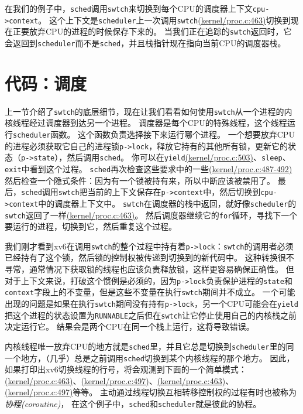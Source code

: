 在我们的例子中，\texttt{sched}调用\texttt{swtch}来切换到每个CPU的调度器上下文\texttt{cpu->context}。
这个上下文是\texttt{scheduler}上一次调用\texttt{swtch}\href{https://github.com/mit-pdos/xv6-riscv/blob/risc/kernel/proc.c#L463}{(kernel/proc.c:463)}切换到现在正要放弃CPU的进程的时候保存下来的。
当我们正在追踪的\texttt{swtch}返回时，它会返回到\texttt{scheduler}而不是\texttt{sched}，并且栈指针现在指向当前CPU的调度器栈。

\section{代码：调度}
上一节介绍了\texttt{swtch}的底层细节，现在让我们看看如何使用\texttt{swtch}从一个进程的内核线程经过调度器到达另一个进程。
调度器是每个CPU的特殊线程，这个线程运行\texttt{scheduler}函数。
这个函数负责选择接下来运行哪个进程。
一个想要放弃CPU的进程必须获取它自己的进程锁\texttt{p->lock}，释放它持有的其他所有锁，更新它的状态（\texttt{p->state}），然后调用\texttt{sched}。
你可以在\texttt{yield}\href{https://github.com/mit-pdos/xv6-riscv/blob/risc/kernel/proc.c#L503}{(kernel/proc.c:503)}、\texttt{sleep}、\texttt{exit}中看到这个过程。
\texttt{sched}再次检查这些要求中的一些\href{https://github.com/mit-pdos/xv6-riscv/blob/risc/kernel/proc.c#L487-L492}{(kernel/proc.c:487-492)}然后检查一个隐式条件：因为有一个锁被持有来，所以中断应该被禁用了。
最后，\texttt{sched}调用\texttt{swtch}把当前的上下文保存在\texttt{p->context}中，然后切换到\texttt{cpu->context}中的调度器上下文中。
\texttt{swtch}在调度器的栈中返回，就好像\texttt{scheduler}的\texttt{swtch}返回了一样\href{https://github.com/mit-pdos/xv6-riscv/blob/risc/kernel/proc.c#L463}{(kernel/proc.c:463)}。
然后调度器继续它的\texttt{for}循环，寻找下一个要运行的进程，切换到它，然后重复这个过程。

我们刚才看到xv6在调用\texttt{swtch}的整个过程中持有着\texttt{p->lock}：\texttt{swtch}的调用者必须已经持有了这个锁，然后锁的控制权被传递到切换到的新代码中。
这种转换很不寻常，通常情况下获取锁的线程也应该负责释放锁，这样更容易确保正确性。
但对于上下文来说，打破这个惯例是必须的，因为\texttt{p->lock}负责保护进程的\texttt{state}和\texttt{context}字段上的不变量，但是这些不变量在执行\texttt{swtch}期间并不成立。
一个可能出现的问题是如果在执行\texttt{swtch}期间没有持有\texttt{p->lock}，另一个CPU可能会在\texttt{yield}把这个进程的状态设置为\texttt{RUNNABLE}之后但在\texttt{swtch}让它停止使用自己的内核栈之前决定运行它。
结果会是两个CPU在同一个栈上运行，这将导致错误。

内核线程唯一放弃CPU的地方就是\texttt{sched}里，并且它总是切换到\texttt{scheduler}里的同一个地方，（几乎）总是之前调用\texttt{sched}切换到某个内核线程的那个地方。
因此，如果打印出xv6切换线程的行号，将会观测到下面的一个简单模式：\href{https://github.com/mit-pdos/xv6-riscv/blob/risc/kernel/proc.c#L463}{(kernel/proc.c:463)}、\href{https://github.com/mit-pdos/xv6-riscv/blob/risc/kernel/proc.c#L497}{(kernel/proc.c:497)}、\href{https://github.com/mit-pdos/xv6-riscv/blob/risc/kernel/proc.c#L463}{(kernel/proc.c:463)}、\href{https://github.com/mit-pdos/xv6-riscv/blob/risc/kernel/proc.c#L497}{(kernel/proc.c:497)}等等。
主动通过线程切换互相转移控制权的过程有时也被称为\emph{协程(coroutine)}，
在这个例子中，\texttt{sched}和\texttt{scheduler}就是彼此的协程。

